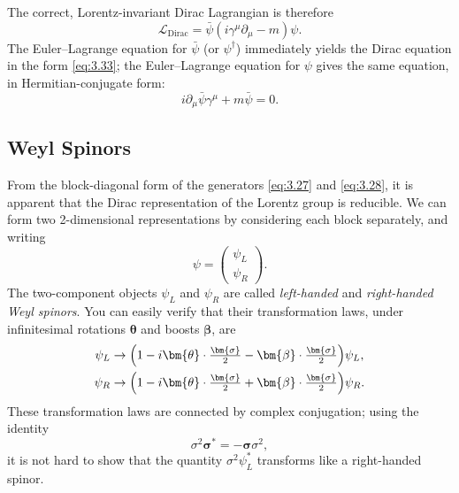 The correct, Lorentz-invariant Dirac Lagrangian is therefore
\begin{equation}
  \mathcal{L}_{\mathrm{Dirac}} = \bar{\psi}(i\gamma^\mu\partial_\mu
    - m)\psi .
  \label{eq:3.36}
\end{equation}
The Euler--Lagrange equation for $\bar{\psi}$ (or $\psi^\dagger$)
immediately yields the Dirac equation in the form \eqref{eq:3.33}; the
Euler--Lagrange equation for $\psi$ gives the same equation, in
Hermitian-conjugate form:
\begin{equation}
  i\partial_\mu\bar{\psi}\gamma^\mu + m\bar{\psi} = 0 .
  \label{eq:3.37}
\end{equation}

\subsection{Weyl Spinors}

From the block-diagonal form of the generators \eqref{eq:3.27} and
\eqref{eq:3.28}, it is apparent that the Dirac representation of the Lorentz
group is reducible.  We can form two 2-dimensional representations by
considering each block separately, and writing
\begin{equation}
  \psi = \begin{pmatrix}\psi_L\\ \psi_R\end{pmatrix}.
  \label{eq:3.38}
\end{equation}
The two-component objects $\psi_L$ and $\psi_R$ are called \emph{left-handed}
and \emph{right-handed Weyl spinors}.  You can easily verify that their
transformation laws, under infinitesimal rotations $\bm{\theta}$ and boosts
$\bm{\beta}$, are
\begin{align}
  \psi_L &\to \Bigl( 1 - i\bm{\theta}\cdot\tfrac{\bm{\sigma}}{2}
    - \bm{\beta}\cdot\tfrac{\bm{\sigma}}{2} \Bigr)\psi_L,\\
  \psi_R &\to \Bigl( 1 - i\bm{\theta}\cdot\tfrac{\bm{\sigma}}{2}
    + \bm{\beta}\cdot\tfrac{\bm{\sigma}}{2} \Bigr)\psi_R .
  \label{eq:3.39}
\end{align}
These transformation laws are connected by complex conjugation; using the
identity
\begin{equation}
  \sigma^2\bm{\sigma}^{*} = -\bm{\sigma}\sigma^2,
  \label{eq:3.40}
\end{equation}
it is not hard to show that the quantity $\sigma^2\psi_L^{*}$ transforms like
a right-handed spinor.

